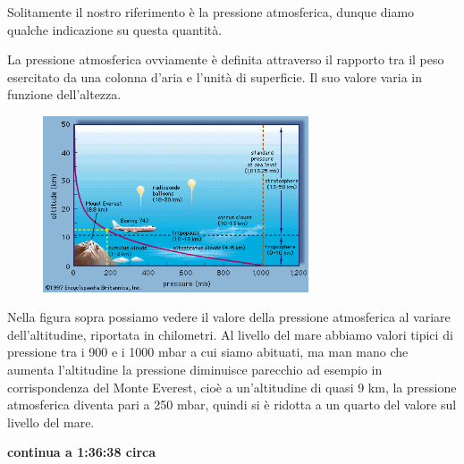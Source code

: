 Solitamente il nostro riferimento è la pressione atmosferica, dunque diamo qualche indicazione su questa quantità.

La pressione atmosferica ovviamente è definita attraverso il rapporto tra il peso esercitato da una colonna d'aria e l'unità di superficie. Il suo valore varia in funzione dell'altezza.
\begin{figure}[H]
   \centering
   \includegraphics[width=0.7\textwidth]{immagini/pressione_atmosferica.png}
\end{figure}
Nella figura sopra possiamo vedere il valore della pressione atmosferica al variare dell'altitudine, riportata in chilometri. Al livello del mare abbiamo valori tipici di pressione tra i 900 e i 1000 mbar a cui siamo abituati, ma man mano che aumenta l'altitudine la pressione diminuisce parecchio ad esempio in corrispondenza del Monte Everest, cioè a un'altitudine di quasi 9 km, la pressione atmosferica diventa pari a 250 mbar, quindi si è ridotta a un quarto del valore sul livello del mare.

\textbf{continua a 1:36:38 circa}

